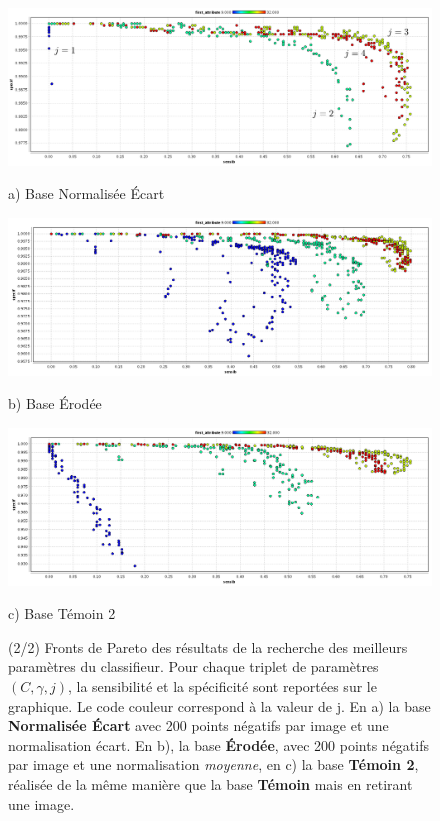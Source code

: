 \begin{figure}[h!]
\begin{center}


\includegraphics[width=14cm]{images/pareto_param_range}

{\small a) Base Normalisée \'Ecart}

\vspace{0.5cm}

\includegraphics[width=14cm]{images/pareto_param_erosion.png}

{\small b) Base Érodée}

 \includegraphics[width=14cm]{images/pareto_param_200_2.png}

{\small c) Base Témoin 2}

\end{center}
 \caption[(2/2) Recherche des meilleurs paramètres du classifieurs : Fronts de pareto ]{(2/2) Fronts de Pareto des résultats de la recherche des meilleurs paramètres du classifieur. Pour chaque triplet de paramètres $(C, \gamma, j)$, la sensibilité et la spécificité sont reportées sur le graphique. Le code couleur correspond à la valeur de j. En a) la base \textbf{Normalisée Écart} avec 200 points négatifs par image et une normalisation écart. En b), la base \textbf{Érodée}, avec 200 points négatifs par image et une normalisation \emph{moyenne}, en c) la base \textbf{Témoin 2}, réalisée de la même manière que la base \textbf{Témoin} mais en retirant une image. }
\label{fig:paretoParams2}
\end{figure}


